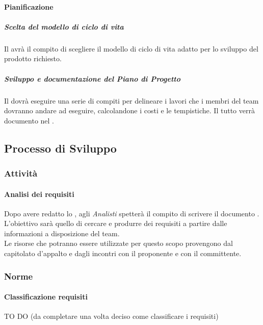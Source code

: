 			\paragraph{Pianificazione}
				\subparagraph{Scelta del modello di ciclo di vita}
Il \roleProjectManager{} avrà il compito di scegliere il modello di ciclo di vita adatto per lo sviluppo del prodotto richiesto.
				\subparagraph{Sviluppo e documentazione del Piano di Progetto}
Il \roleProjectManager{} dovrà eseguire una serie di compiti per delineare i lavori che i membri del team dovranno andare ad eseguire, calcolandone i costi e le tempistiche. Il tutto verrà documento nel \docNameVersionPdP{}.
		
	\subsection{Processo di Sviluppo}
		\subsubsection{Attività}
			\paragraph{Analisi dei requisiti}
Dopo avere redatto lo \docNameSdF{}, agli \emph{Analisti} spetterà il compito di scrivere il documento \docNameVersionAdR{}. \\
L'obiettivo sarà quello di cercare e produrre dei requisiti a partire dalle informazioni a disposizione del team. \\
Le risorse che potranno essere utilizzate per questo scopo provengono dal capitolato d'appalto e dagli incontri con il proponente e con il committente. \\

		\subsubsection{Norme}
			\paragraph{Classificazione requisiti}
TO DO (da completare una volta deciso come classificare i requisiti)			
